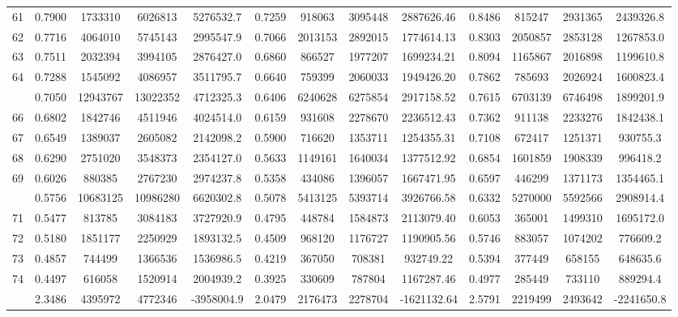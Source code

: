 \documentclass[
  12pt,
]{article}
\begin{document}
\begin{longtable}[t]{lcccccccccccc}
61 & 0.7900 & 1733310 & 6026813 & 5276532.7 & 0.7259 & 918063 & 3095448 & 2887626.46 & 0.8486 & 815247 & 2931365 & 2439326.8\\
62 & 0.7716 & 4064010 & 5745143 & 2995547.9 & 0.7066 & 2013153 & 2892015 & 1774614.13 & 0.8303 & 2050857 & 2853128 & 1267853.0\\
63 & 0.7511 & 2032394 & 3994105 & 2876427.0 & 0.6860 & 866527 & 1977207 & 1699234.21 & 0.8094 & 1165867 & 2016898 & 1199610.8\\
64 & 0.7288 & 1545092 & 4086957 & 3511795.7 & 0.6640 & 759399 & 2060033 & 1949426.20 & 0.7862 & 785693 & 2026924 & 1600823.4\\
\addlinespace
65 & 0.7050 & 12943767 & 13022352 & 4712325.3 & 0.6406 & 6240628 & 6275854 & 2917158.52 & 0.7615 & 6703139 & 6746498 & 1899201.9\\
66 & 0.6802 & 1842746 & 4511946 & 4024514.0 & 0.6159 & 931608 & 2278670 & 2236512.43 & 0.7362 & 911138 & 2233276 & 1842438.1\\
67 & 0.6549 & 1389037 & 2605082 & 2142098.2 & 0.5900 & 716620 & 1353711 & 1254355.31 & 0.7108 & 672417 & 1251371 & 930755.3\\
68 & 0.6290 & 2751020 & 3548373 & 2354127.0 & 0.5633 & 1149161 & 1640034 & 1377512.92 & 0.6854 & 1601859 & 1908339 & 996418.2\\
69 & 0.6026 & 880385 & 2767230 & 2974237.8 & 0.5358 & 434086 & 1396057 & 1667471.95 & 0.6597 & 446299 & 1371173 & 1354465.1\\
\addlinespace
70 & 0.5756 & 10683125 & 10986280 & 6620302.8 & 0.5078 & 5413125 & 5393714 & 3926766.58 & 0.6332 & 5270000 & 5592566 & 2908914.4\\
71 & 0.5477 & 813785 & 3084183 & 3727920.9 & 0.4795 & 448784 & 1584873 & 2113079.40 & 0.6053 & 365001 & 1499310 & 1695172.0\\
72 & 0.5180 & 1851177 & 2250929 & 1893132.5 & 0.4509 & 968120 & 1176727 & 1190905.56 & 0.5746 & 883057 & 1074202 & 776609.2\\
73 & 0.4857 & 744499 & 1366536 & 1536986.5 & 0.4219 & 367050 & 708381 & 932749.22 & 0.5394 & 377449 & 658155 & 648635.6\\
74 & 0.4497 & 616058 & 1520914 & 2004939.2 & 0.3925 & 330609 & 787804 & 1167287.46 & 0.4977 & 285449 & 733110 & 889294.4\\
\addlinespace
75 & 2.3486 & 4395972 & 4772346 & -3958004.9 & 2.0479 & 2176473 & 2278704 & -1621132.64 & 2.5791 & 2219499 & 2493642 & -2241650.8\\*
\end{longtable}
\endgroup{}
\end{document}
